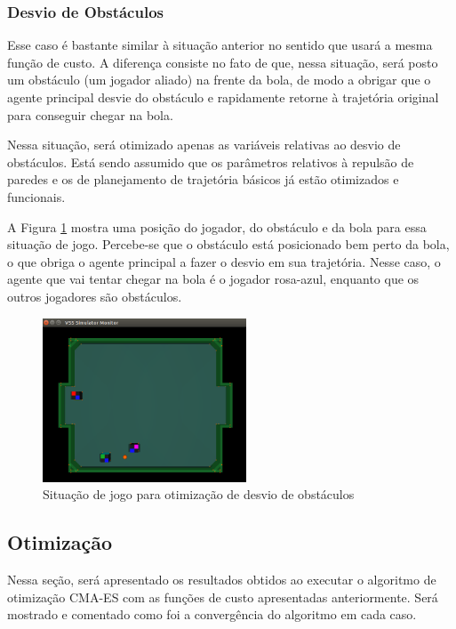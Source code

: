 \documentclass[10pt,fleqn,a4paper]{article}
\begin{document}
\subsubsection{Desvio de Obstáculos}

Esse caso é bastante similar à situação anterior no sentido que usará a mesma função de custo. A diferença consiste no fato de que, nessa situação, será posto um obstáculo (um jogador aliado) na frente da bola, de modo a obrigar que o agente principal desvie do obstáculo e rapidamente retorne à trajetória original para conseguir chegar na bola.

Nessa situação, será otimizado apenas as variáveis relativas ao desvio de obstáculos. Está sendo assumido que os parâmetros relativos à repulsão de paredes e os de planejamento de trajetória básicos já estão otimizados e funcionais.

A Figura \ref{fig:com_obstaculo_simulacao} mostra uma posição do jogador, do obstáculo e da bola para essa situação de jogo. Percebe-se que o obstáculo está posicionado bem perto da bola, o que obriga o agente principal a fazer o desvio em sua trajetória. Nesse caso, o agente que vai tentar chegar na bola é o jogador rosa-azul, enquanto que os outros jogadores são obstáculos.

\begin{figure}[H]
	\centering
	\includegraphics[width=0.54\textwidth]{figures/OtimizacaoComObstaculoSimulacao.png}
	\caption{Situação de jogo para otimização de desvio de obstáculos}
	\label{fig:com_obstaculo_simulacao}
\end{figure}


\subsection{Otimização}

Nessa seção, será apresentado os resultados obtidos ao executar o algoritmo de otimização CMA-ES com as funções de custo apresentadas anteriormente. Será mostrado e comentado como foi a convergência do algoritmo em cada caso.
\end{document}
